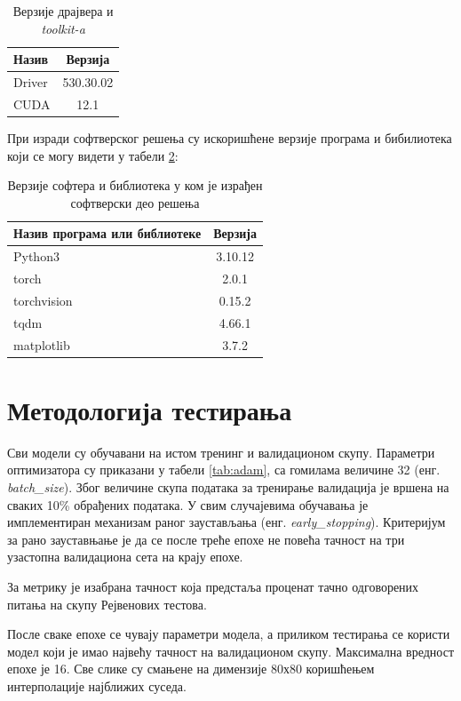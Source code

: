 \documentclass[a4paper, 12pt, master, utf8]{etf}
\begin{document}
\begin{table}[h]
    \centering
    \begin{tabular}{l | c}
    \hline
    Назив & Верзија\\
    \hline
        Driver & 530.30.02\\
        CUDA & 12.1 \\
    \end{tabular}
    \caption{Верзије драјвера и \textit{toolkit-a}}
    \label{tab:hw}
\end{table}

При изради софтверског решења су искоришћене верзије програма и бибилиотека који се могу видети у табели \ref{tab:sw}:
\newline

\begin{table}[h]
    \centering
    \begin{tabular}{l | c}
    \hline
    Назив програма или библиотеке & Верзија\\
    \hline
        Python3 & 3.10.12\\
        torch & 2.0.1\\
        torchvision & 0.15.2\\
        tqdm & 4.66.1\\
        matplotlib & 3.7.2
    \end{tabular}
    \caption{Верзије софтера и библиотека у ком је израђен софтверски део решења}
    \label{tab:sw}
\end{table}

\section{Методологија тестирања}
\label{sec:52}

Сви модели су обучавани на истом тренинг и валидационом скупу. Параметри оптимизатора су приказани у табели \ref{tab:adam}, са гомилама величине 32 (енг. \textit{batch\_size}).
Због величине скупа података за тренирање валидација је вршена на сваких 10\% обрађених података.
У свим случајевима обучавања је имплементиран механизам раног заустављања (енг. \textit{early\_stopping}). Критеријум за рано зауставњање је да се после треће епохе не повећа 
тачност на три узастопна валидациона сета на крају епохе.
\newline

За метрику је изабрана тачност која предстаља проценат тачно одговорених питања на скупу Рејвенових тестова.

После сваке епохе се чувају параметри модела, а приликом тестирања се користи модел који је имао највећу тачност на валидационом скупу.
Максимална вредност епохе је 16.
Све слике су смањене на димензије 80х80 коришћењем интерполације најближих суседа.
\newline
\end{document}
